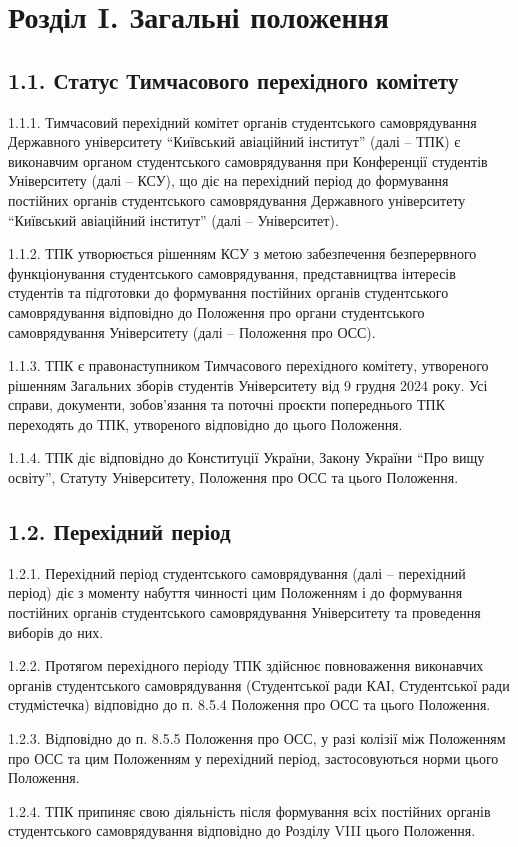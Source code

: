 \section*{Розділ I. Загальні положення}

\subsection*{1.1. Статус Тимчасового перехідного комітету}
    1.1.1. Тимчасовий перехідний комітет органів студентського самоврядування Державного університету ``Київський авіаційний інститут'' (далі -- ТПК) є виконавчим органом студентського самоврядування при Конференції студентів Університету (далі -- КСУ), що діє на перехідний період до формування постійних органів студентського самоврядування Державного університету ``Київський авіаційний інститут'' (далі -- Університет).

    1.1.2. ТПК утворюється рішенням КСУ з метою забезпечення безперервного функціонування студентського самоврядування, представництва інтересів студентів та підготовки до формування постійних органів студентського самоврядування відповідно до Положення про органи студентського самоврядування Університету (далі -- Положення про ОСС).

    1.1.3. ТПК є правонаступником Тимчасового перехідного комітету, утвореного рішенням Загальних зборів студентів Університету від 9 грудня 2024 року. Усі справи, документи, зобов'язання та поточні проєкти попереднього ТПК переходять до ТПК, утвореного відповідно до цього Положення.

    1.1.4. ТПК діє відповідно до Конституції України, Закону України ``Про вищу освіту'', Статуту Університету, Положення про ОСС та цього Положення.

\subsection*{1.2. Перехідний період}
    1.2.1. Перехідний період студентського самоврядування (далі -- перехідний період) діє з моменту набуття чинності цим Положенням і до формування постійних органів студентського самоврядування Університету та проведення виборів до них.

    1.2.2. Протягом перехідного періоду ТПК здійснює повноваження виконавчих органів студентського самоврядування (Студентської ради КАІ, Студентської ради студмістечка) відповідно до п. 8.5.4 Положення про ОСС та цього Положення.

    1.2.3. Відповідно до п. 8.5.5 Положення про ОСС, у разі колізії між Положенням про ОСС та цим Положенням у перехідний період, застосовуються норми цього Положення.

    1.2.4. ТПК припиняє свою діяльність після формування всіх постійних органів студентського самоврядування відповідно до Розділу VIII цього Положення.
